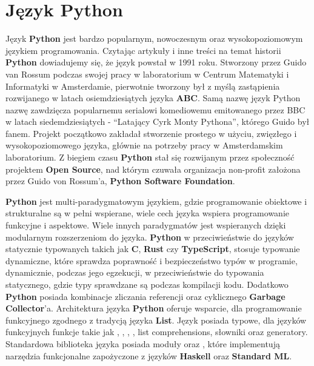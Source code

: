 


\section{Język Python}
Język \textbf{Python} jest bardzo popularnym, nowoczesnym oraz wysokopoziomowym językiem programowania. Czytając artykuły i inne treści na temat historii \textbf{Python} \cite{HistoriaPythona} \cite{WikipediaPythonProgrammingLanauge} dowiadujemy się, że język powstał w 1991 roku. Stworzony przez Guido van Rossum podczas swojej pracy w laboratorium w Centrum Matematyki i Informatyki w Amsterdamie, pierwotnie tworzony był z myślą zastąpienia rozwijanego w latach osiemdziesiątych języka \textbf{ABC}. Samą nazwę język Python nazwę zawdzięcza popularnemu serialowi komediowemu emitowanego przez BBC w latach siedemdziesiątych - ``Latający Cyrk Monty Pythona'', którego Guido był fanem.
Projekt początkowo zakładał stworzenie prostego w użyciu, zwięzłego i wysokopoziomowego języka, głównie na potrzeby pracy w Amsterdamskim laboratorium. Z biegiem czasu \textbf{Python} stał się rozwijanym przez społeczność projektem \textbf{Open Source}, nad którym czuwała organizacja non-profit założona przez Guido von Rossum'a, \textbf{Python Software Foundation}.

\textbf{Python} jest multi-paradygmatowym językiem, gdzie programowanie obiektowe i strukturalne są w pełni wspierane, wiele cech języka wspiera programowanie funkcyjne i aspektowe. Wiele innych paradygmatów jest wspieranych dzięki modularnym rozszerzeniom do języka.
\textbf{Python} w przeciwieństwie do języków statycznie typowanych takich jak \textbf{C}, \textbf{Rust} czy \textbf{TypeScript}, stosuje typowanie dynamiczne, które sprawdza poprawność i bezpieczeństwo typów w programie, dynamicznie, podczas jego egzekucji, w przeciwieństwie do typowania statycznego, gdzie typy sprawdzane są podczas kompilacji kodu. Dodatkowo \textbf{Python} posiada kombinacje zliczania referencji oraz cyklicznego \textbf{Garbage Collector}'a.
Architektura języka \textbf{Python} oferuje wsparcie, dla programowanie funkcyjnego zgodnego z tradycją języka \textbf{List}. Język posiada typowe, dla języków funkcyjnych funkcje takie jak , , , , list comprehensions, słowniki oraz generatory. Standardowa biblioteka języka posiada moduły  oraz , które implementują narzędzia funkcjonalne zapożyczone z języków \textbf{Haskell} oraz \textbf{Standard ML}.

